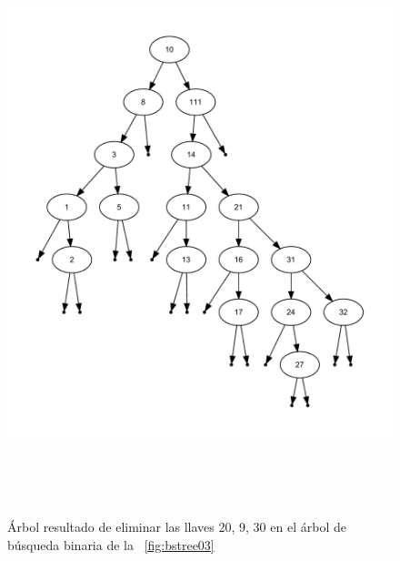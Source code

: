 \documentclass[paper=a4, fontsize=11pt]{scrartcl} %
\numberwithin{equation}{section} %
\numberwithin{figure}{section} %
\numberwithin{table}{section} %
\begin{document}
\begin{figure}[!h]
	\centering
	\includegraphics[width=\textwidth,height=17cm]{bstree05}	
	\caption{Árbol resultado de eliminar las llaves 20, 9, 30 en el árbol de búsqueda binaria de la \figurename~\ref{fig:bstree03}}
	\label{fig:bstree05}
\end{figure}
\newpage
\end{document}
